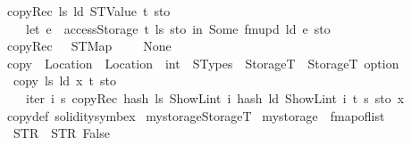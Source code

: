 \begin{isabellebody}
{\isacharbar}{\kern0pt}\ {\isachardoublequoteopen}copyRec\ l\isactrlsub s\ l\isactrlsub d\ {\isacharparenleft}{\kern0pt}STValue\ t{\isacharparenright}{\kern0pt}\ sto\ {\isacharequal}{\kern0pt}\isanewline
\ \ \ \ {\isacharparenleft}{\kern0pt}let\ e\ {\isacharequal}{\kern0pt}\ accessStorage\ t\ l\isactrlsub s\ sto\ in\ Some\ {\isacharparenleft}{\kern0pt}fmupd\ l\isactrlsub d\ e\ sto{\isacharparenright}{\kern0pt}{\isacharparenright}{\kern0pt}{\isachardoublequoteclose}\isanewline
{\isacharbar}{\kern0pt}\ {\isachardoublequoteopen}copyRec\ {\isacharunderscore}{\kern0pt}\ {\isacharunderscore}{\kern0pt}\ {\isacharparenleft}{\kern0pt}STMap\ {\isacharunderscore}{\kern0pt}\ {\isacharunderscore}{\kern0pt}{\isacharparenright}{\kern0pt}\ {\isacharunderscore}{\kern0pt}\ {\isacharequal}{\kern0pt}\ None{\isachardoublequoteclose}\isanewline
\ \isanewline
{}\isamarkupfalse%
\ copy\ {\isacharcolon}{\kern0pt}{\isacharcolon}{\kern0pt}\ {\isachardoublequoteopen}Location\ {\isasymRightarrow}\ Location\ {\isasymRightarrow}\ int\ {\isasymRightarrow}\ STypes\ {\isasymRightarrow}\ StorageT\ {\isasymRightarrow}\ StorageT\ option{\isachardoublequoteclose}\isanewline
{}\isanewline
\ \ {\isachardoublequoteopen}copy\ l\isactrlsub s\ l\isactrlsub d\ x\ t\ sto\ {\isacharequal}{\kern0pt}\isanewline
\ \ \ \ iter{\isacharprime}{\kern0pt}\ {\isacharparenleft}{\kern0pt}{\isasymlambda}i\ s{\isacharprime}{\kern0pt}{\isachardot}{\kern0pt}\ copyRec\ {\isacharparenleft}{\kern0pt}hash\ l\isactrlsub s\ {\isacharparenleft}{\kern0pt}ShowL\isactrlsub i\isactrlsub n\isactrlsub t\ i{\isacharparenright}{\kern0pt}{\isacharparenright}{\kern0pt}\ {\isacharparenleft}{\kern0pt}hash\ l\isactrlsub d\ {\isacharparenleft}{\kern0pt}ShowL\isactrlsub i\isactrlsub n\isactrlsub t\ i{\isacharparenright}{\kern0pt}{\isacharparenright}{\kern0pt}\ t\ s{\isacharprime}{\kern0pt}{\isacharparenright}{\kern0pt}\ sto\ x{\isachardoublequoteclose}\isanewline
\isanewline
{}\isamarkupfalse%
\ copy{\isacharunderscore}{\kern0pt}def\ {\isacharbrackleft}{\kern0pt}solidity{\isacharunderscore}{\kern0pt}symbex{\isacharbrackright}{\kern0pt}\isanewline
\isanewline
\isanewline
{}\isamarkupfalse%
\ mystorage{}{\isacharcolon}{\kern0pt}{\isacharcolon}{\kern0pt}StorageT\isanewline
{}\ {\isachardoublequoteopen}mystorage{}\ {\isasymequiv}\ {\isacharparenleft}{\kern0pt}fmap{\isacharunderscore}{\kern0pt}of{\isacharunderscore}{\kern0pt}list\isanewline
\ \ {\isacharbrackleft}{\kern0pt}{\isacharparenleft}{\kern0pt}STR\ {\isacharprime}{\kern0pt}{\isacharprime}{\kern0pt}{}{\isachardot}{\kern0pt}{}{\isachardot}{\kern0pt}{}{\isacharprime}{\kern0pt}{\isacharprime}{\kern0pt}{\isacharcomma}{\kern0pt}\ STR\ {\isacharprime}{\kern0pt}{\isacharprime}{\kern0pt}False{\isacharprime}{\kern0pt}{\isacharprime}{\kern0pt}{\isacharparenright}{\kern0pt}{\isacharcomma}{\kern0pt}\isanewline

\end{isabellebody}
